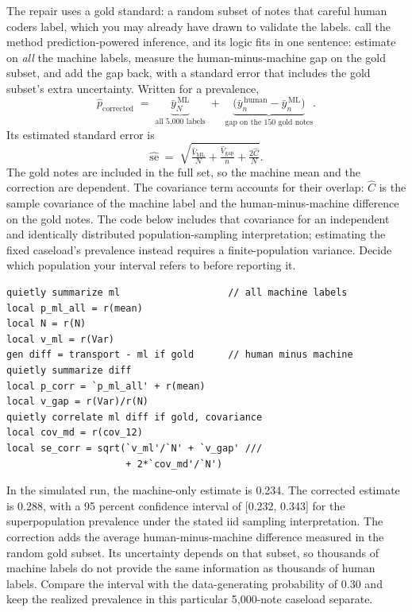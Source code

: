 The repair uses a gold standard: a random subset of notes that careful human coders label, which you may already have drawn to validate the labels. \textcite{angelopoulos2023ppi} call the method prediction-powered inference, and its logic fits in one sentence: estimate on \emph{all} the machine labels, measure the human-minus-machine gap on the gold subset, and add the gap back, with a standard error that includes the gold subset's extra uncertainty. Written for a prevalence,
\[
\hat{p}_{\text{corrected}}
\;=\;
\underbrace{\bar{y}^{\,\text{ML}}_{N}}_{\text{all 5{,}000 labels}}
\;+\;
\underbrace{\bigl(\bar{y}^{\,\text{human}}_{n} - \bar{y}^{\,\text{ML}}_{n}\bigr)}_{\text{gap on the 150 gold notes}}.
\]
Its estimated standard error is
\[
\widehat{\text{se}}
\;=\;
\sqrt{\tfrac{\widehat{V}_{\text{ML}}}{N} + \tfrac{\widehat{V}_{\text{gap}}}{n} + \tfrac{2\widehat C}{N}}.
\]
The gold notes are included in the full set, so the machine mean and the correction are dependent. The covariance term accounts for their overlap: $\widehat C$ is the sample covariance of the machine label and the human-minus-machine difference on the gold notes. The code below includes that covariance for an independent and identically distributed population-sampling interpretation; estimating the fixed caseload's prevalence instead requires a finite-population variance. Decide which population your interval refers to before reporting it.
\par
{\footnotesize
\begin{verbatim}
quietly summarize ml                   // all machine labels
local p_ml_all = r(mean)
local N = r(N)
local v_ml = r(Var)
gen diff = transport - ml if gold      // human minus machine
quietly summarize diff
local p_corr = `p_ml_all' + r(mean)
local v_gap = r(Var)/r(N)
quietly correlate ml diff if gold, covariance
local cov_md = r(cov_12)
local se_corr = sqrt(`v_ml'/`N' + `v_gap' ///
                     + 2*`cov_md'/`N')
\end{verbatim}
}
In the simulated run, the machine-only estimate is 0.234. The corrected estimate is 0.288, with a 95 percent confidence interval of [0.232, 0.343] for the superpopulation prevalence under the stated iid sampling interpretation. The correction adds the average human-minus-machine difference measured in the random gold subset. Its uncertainty depends on that subset, so thousands of machine labels do not provide the same information as thousands of human labels. Compare the interval with the data-generating probability of 0.30 and keep the realized prevalence in this particular 5{,}000-note caseload separate.

